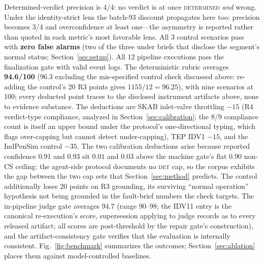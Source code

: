 \documentclass[preprint,10pt]{elsarticle}
\begin{document}
Determined-verdict precision is 4/4: no verdict is at once \mbox{\textsc{determined}} \emph{and} wrong. Under the identity-strict lens the batch-93 discount propagates here too: precision becomes 3/4 and overconfidence at least one---the asymmetry is reported rather than quoted in each metric's most favorable lens. All 3 control scenarios pass with \textbf{zero false alarms} (two of the three under briefs that disclose the segment's normal status; Section~\ref{sec:setup}). All 12 pipeline executions pass the finalization gate with valid event logs. The deterministic rubric averages \textbf{94.6/100} (96.3 excluding the mis-specified control check discussed above: re-adding the control's 20 R3 points gives $1155/12 = 96.25$), with nine scenarios at 100; every deducted point traces to the disclosed instrument artifacts above, none to evidence substance. The deductions are SKAB inlet-valve throttling $-15$ (R4 verdict-type compliance, analyzed in Section~\ref{sec:calibration}; the 8/9 compliance count is itself an upper bound under the protocol's one-directional typing, which flags over-capping but cannot detect under-capping), TEP IDV1 $-15$, and the IndPenSim control $-35$. The two calibration deductions arise because reported confidence 0.91 and 0.93 sit $0.01$ and $0.03$ above the machine gate's flat 0.90 non-CS ceiling: the agent-side protocol documents no \mbox{\textsc{det}} cap, so the corpus exhibits the gap between the two cap sets that Section~\ref{sec:method} predicts. The control additionally loses 20 points on R3 grounding, its surviving ``normal operation'' hypothesis not being grounded in the fault-brief numbers the check targets. The in-pipeline judge gate averages 94.7 (range 90--98; the IDV11 entry is the canonical re-execution's score, supersession applying to judge records as to every released artifact; all scores are post-threshold by the repair gate's construction), and the artifact-consistency gate verifies that the evaluation is internally consistent. Fig.~\ref{fig:benchmark} summarizes the outcomes; Section~\ref{sec:ablation} places them against model-controlled baselines.
\end{document}
